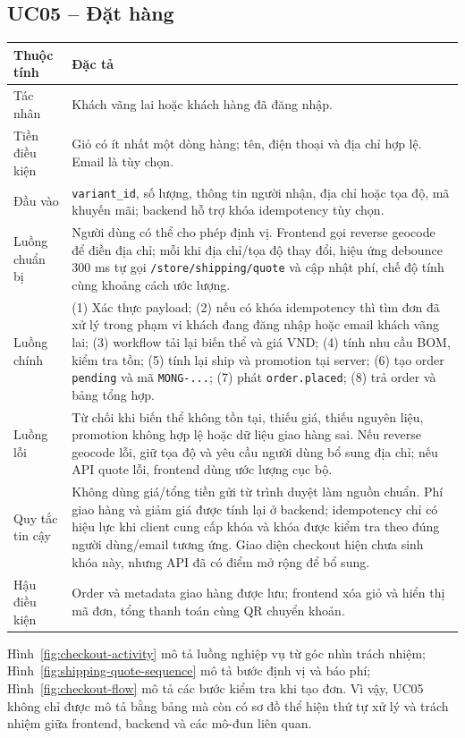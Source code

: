 \subsection{UC05 -- Đặt hàng}

\begin{longtable}{@{}L{0.23\textwidth}L{0.69\textwidth}@{}}
  \toprule
  \textbf{Thuộc tính} & \textbf{Đặc tả} \\
  \midrule
  Tác nhân & Khách vãng lai hoặc khách hàng đã đăng nhập. \\
  Tiền điều kiện & Giỏ có ít nhất một dòng hàng; tên, điện thoại và địa chỉ hợp lệ. Email là tùy chọn. \\
  Đầu vào & \texttt{variant\_id}, số lượng, thông tin người nhận, địa chỉ hoặc tọa độ, mã khuyến mãi; backend hỗ trợ khóa idempotency tùy chọn. \\
  Luồng chuẩn bị & Người dùng có thể cho phép định vị. Frontend gọi reverse geocode để điền địa chỉ; mỗi khi địa chỉ/tọa độ thay đổi, hiệu ứng debounce 300 ms tự gọi \texttt{/store/shipping/quote} và cập nhật phí, chế độ tính cùng khoảng cách ước lượng. \\
  Luồng chính & (1) Xác thực payload; (2) nếu có khóa idempotency thì tìm đơn đã xử lý trong phạm vi khách đang đăng nhập hoặc email khách vãng lai; (3) workflow tải lại biến thể và giá VND; (4) tính nhu cầu BOM, kiểm tra tồn; (5) tính lại ship và promotion tại server; (6) tạo order \texttt{pending} và mã \texttt{MONG-...}; (7) phát \texttt{order.placed}; (8) trả order và bảng tổng hợp. \\
  Luồng lỗi & Từ chối khi biến thể không tồn tại, thiếu giá, thiếu nguyên liệu, promotion không hợp lệ hoặc dữ liệu giao hàng sai. Nếu reverse geocode lỗi, giữ tọa độ và yêu cầu người dùng bổ sung địa chỉ; nếu API quote lỗi, frontend dùng ước lượng cục bộ. \\
  Quy tắc tin cậy & Không dùng giá/tổng tiền gửi từ trình duyệt làm nguồn chuẩn. Phí giao hàng và giảm giá được tính lại ở backend; idempotency chỉ có hiệu lực khi client cung cấp khóa và khóa được kiểm tra theo đúng người dùng/email tương ứng. Giao diện checkout hiện chưa sinh khóa này, nhưng API đã có điểm mở rộng để bổ sung. \\
  Hậu điều kiện & Order và metadata giao hàng được lưu; frontend xóa giỏ và hiển thị mã đơn, tổng thanh toán cùng QR chuyển khoản. \\
  \bottomrule
\end{longtable}

Hình~\ref{fig:checkout-activity} mô tả luồng nghiệp vụ từ góc nhìn trách nhiệm; Hình~\ref{fig:shipping-quote-sequence} mô tả bước định vị và báo phí; Hình~\ref{fig:checkout-flow} mô tả các bước kiểm tra khi tạo đơn. Vì vậy, UC05 không chỉ được mô tả bằng bảng mà còn có sơ đồ thể hiện thứ tự xử lý và trách nhiệm giữa frontend, backend và các mô-đun liên quan.

